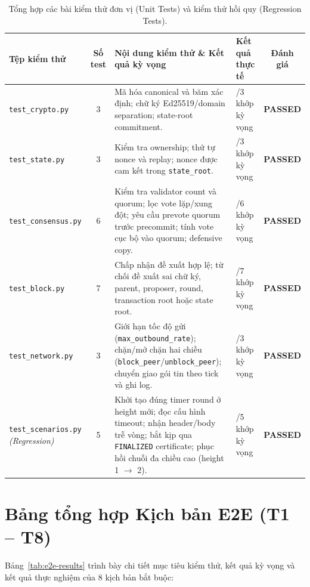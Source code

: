 \documentclass[10pt,a4paper]{report}
\begin{document}
\begin{table}[H]
\centering
\small
\renewcommand{\arraystretch}{1.22}
\begin{tabularx}{\textwidth}{|>{\raggedright\arraybackslash}p{3.3cm}|c|>{\raggedright\arraybackslash}X|>{\centering\arraybackslash}p{2.2cm}|c|}
\hline
\textbf{Tệp kiểm thử} & \textbf{Số test} & \textbf{Nội dung kiểm thử \& Kết quả kỳ vọng} & \textbf{Kết quả thực tế} & \textbf{Đánh giá} \\
\hline
\texttt{test\_crypto.py} & 3 & Mã hóa canonical và băm xác định; chữ ký Ed25519/domain separation; state-root commitment. & 3/3 khớp kỳ vọng & \textbf{PASSED} \\
\hline
\texttt{test\_state.py} & 3 & Kiểm tra ownership; thứ tự nonce và replay; nonce được cam kết trong \texttt{state\_root}. & 3/3 khớp kỳ vọng & \textbf{PASSED} \\
\hline
\texttt{test\_consensus.py} & 6 & Kiểm tra validator count và quorum; lọc vote lặp/xung đột; yêu cầu prevote quorum trước precommit; tính vote cục bộ vào quorum; defensive copy. & 6/6 khớp kỳ vọng & \textbf{PASSED} \\
\hline
\texttt{test\_block.py} & 7 & Chấp nhận đề xuất hợp lệ; từ chối đề xuất sai chữ ký, parent, proposer, round, transaction root hoặc state root. & 7/7 khớp kỳ vọng & \textbf{PASSED} \\
\hline
\texttt{test\_network.py} & 3 & Giới hạn tốc độ gửi (\texttt{max\_outbound\_rate}); chặn/mở chặn hai chiều (\texttt{block\_peer}/\texttt{unblock\_peer}); chuyển giao gói tin theo tick và ghi log. & 3/3 khớp kỳ vọng & \textbf{PASSED} \\
\hline
\texttt{test\_scenarios.py} \emph{(Regression)} & 5 & Khởi tạo đúng timer round ở height mới; đọc cấu hình timeout; nhận header/body trễ vòng; bắt kịp qua \texttt{FINALIZED} certificate; phục hồi chuỗi đa chiều cao (height 1 $\rightarrow$ 2). & 5/5 khớp kỳ vọng & \textbf{PASSED} \\
\hline
\end{tabularx}
\caption{Tổng hợp các bài kiểm thử đơn vị (Unit Tests) và kiểm thử hồi quy (Regression Tests).}
\label{tab:unit-reg-results}
\end{table}

\section{Bảng tổng hợp Kịch bản E2E (T1 -- T8)}
Bảng~\ref{tab:e2e-results} trình bày chi tiết mục tiêu kiểm thử, kết quả kỳ vọng và kết quả thực nghiệm của 8 kịch bản bắt buộc:
\end{document}
